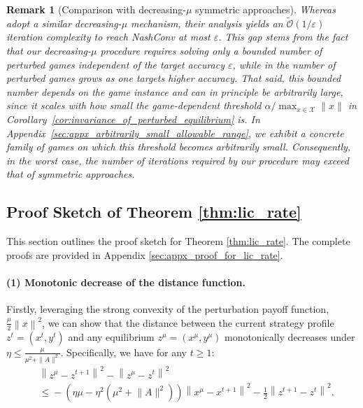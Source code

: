 \documentclass{article}
\newcommand{\X}{\mathcal{X}}
\theoremstyle{plain}
\newtheorem{remark}[theorem]{Remark}
\begin{document}
\begin{remark}[Comparison with decreasing-$\mu$ symmetric approaches]
    \label{rmk:comparison_with_decreasing_mu}
    \normalfont
    Whereas \citet{liu2022power} adopt a similar decreasing-$\mu$ mechanism, their analysis yields an $\tilde{\mathcal{O}}(1/\varepsilon)$ iteration complexity to reach NashConv at most $\varepsilon$.
    This gap stems from the fact that our decreasing-$\mu$ procedure requires solving only a bounded number of perturbed games independent of the target accuracy $\varepsilon$, while in \citet{liu2022power} the number of perturbed games grows as one targets higher accuracy.
    That said, this bounded number depends on the game instance and can in principle be arbitrarily large, since it scales with how small the game-dependent threshold $\alpha/\max_{x\in\X}\|x\|$ in Corollary~\ref{cor:invariance_of_perturbed_equilibrium} is.
    In Appendix~\ref{sec:appx_arbitrarily_small_allowable_range}, we exhibit a concrete family of games on which this threshold becomes arbitrarily small.
    Consequently, in the worst case, the number of iterations required by our procedure may exceed that of symmetric approaches.
\end{remark}


\subsection{Proof Sketch of Theorem \ref{thm:lic_rate}}
This section outlines the proof sketch for Theorem \ref{thm:lic_rate}.
The complete proofs are provided in Appendix \ref{sec:appx_proof_for_lic_rate}.

\paragraph{(1) Monotonic decrease of the distance function.}
Firstly, leveraging the strong convexity of the perturbation payoff function, $\frac{\mu}{2}\left\|x\right\|^2$, we can show that the distance between the current strategy profile $z^t=(x^t, y^t)$ and any equilibrium $z^{\mu}=(x^{\mu}, y^{\mu})$ monotonically decreases under $\eta \leq \frac{\mu}{\mu^2 + \|A\|^2}$.
Specifically, we have for any $t\geq 1$:
\begin{align}
    & \left\|z^{\mu} - z^{t+1}\right\|^2 - \left\|z^{\mu} - z^t\right\|^2 \nonumber                                                                                                         \\
    & \!\leq \! - \! \left(\eta\mu \! - \! \eta^2 \!\left(\mu^2 \! + \! \|A\|^2\right)\right) \!\left\| x^{\mu} - x^{t+1}\right\|^2 \! - \frac{1}{2}\left\| z^{t+1} \! - z^t \right\|^2 \!.
    \label{eq:monotonic_decrease_of_distance}
\end{align}
\end{document}

